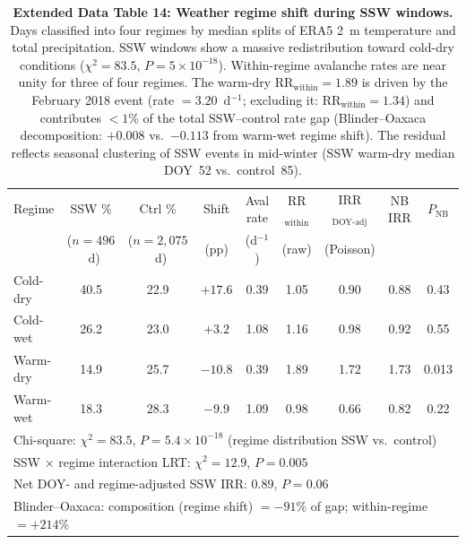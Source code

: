 \documentclass[11pt,letterpaper]{article}
\begin{document}
\begin{table}[!ht]
\centering
\caption{\textbf{Extended Data Table 14: Weather regime shift during SSW windows.}
Days classified into four regimes by median splits of ERA5 2~m temperature and total precipitation. SSW windows show a massive redistribution toward cold-dry conditions ($\chi^2 = 83.5$, $P = 5 \times 10^{-18}$). Within-regime avalanche rates are near unity for three of four regimes. The warm-dry $\mathrm{RR}_{\mathrm{within}} = 1.89$ is driven by the February 2018 event (rate $= 3.20$~d$^{-1}$; excluding it: $\mathrm{RR}_{\mathrm{within}} = 1.34$) and contributes $< 1\%$ of the total SSW--control rate gap (Blinder--Oaxaca decomposition: $+0.008$ vs.\ $-0.113$ from warm-wet regime shift). The residual reflects seasonal clustering of SSW events in mid-winter (SSW warm-dry median DOY~52 vs.\ control~85).}
\label{tab:regime}
\small
\begin{tabular}{lcccccccc}
\toprule
Regime & SSW \% & Ctrl \% & Shift & Aval rate & RR$_{\mathrm{within}}$ & IRR$_{\mathrm{DOY\text{-}adj}}$ & NB IRR & $P_{\mathrm{NB}}$ \\
 & ($n = 496$~d) & ($n = 2{,}075$~d) & (pp) & (d$^{-1}$) & (raw) & (Poisson) & & \\
\midrule
Cold-dry & 40.5 & 22.9 & $+17.6$ & 0.39 & 1.05 & 0.90 & 0.88 & 0.43 \\
Cold-wet & 26.2 & 23.0 & $+3.2$ & 1.08 & 1.16 & 0.98 & 0.92 & 0.55 \\
Warm-dry & 14.9 & 25.7 & $-10.8$ & 0.39 & 1.89 & 1.72 & 1.73 & 0.013 \\
Warm-wet & 18.3 & 28.3 & $-9.9$ & 1.09 & 0.98 & 0.66 & 0.82 & 0.22 \\
\midrule
\multicolumn{9}{l}{Chi-square: $\chi^2 = 83.5$, $P = 5.4 \times 10^{-18}$ (regime distribution SSW vs.\ control)} \\
\multicolumn{9}{l}{SSW $\times$ regime interaction LRT: $\chi^2 = 12.9$, $P = 0.005$} \\
\multicolumn{9}{l}{Net DOY- and regime-adjusted SSW IRR: 0.89, $P = 0.06$} \\
\multicolumn{9}{l}{Blinder--Oaxaca: composition (regime shift) $= -91\%$ of gap; within-regime $= +214\%$} \\
\bottomrule
\end{tabular}
\end{table}

\end{document}

